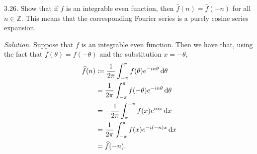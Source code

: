 \documentclass{article}
\newcommand{\Z}{\mathbb{Z}}
\begin{document}
\newpage

3.26. Show that if $f$ is an integrable even function, then $\hat{f}(n)
  = \hat{f}(-n)$ for all $n \in \Z$. This means that the corresponding
  Fourier series is a purely cosine series expansion.

\textit{Solution.}
Suppose that $f$ is an integrable even function. Then we have that,
using the fact that $f(\theta) = f(-\theta)$ and the substitution
$x = - \theta$,
%
\begin{align*}
    \widehat{f}(n)
        &\coloneqq \frac{1}{2 \pi} \int_{-\pi}^\pi f(\theta) e^{-i n \theta} \dif \theta \\
        &= \frac{1}{2 \pi} \int_{-\pi}^\pi f(-\theta) e^{-i n \theta} \dif \theta \\
        &= - \frac{1}{2 \pi} \int_{\pi}^{-\pi} f(x) e^{i n x} \dif x \\
        &= \frac{1}{2 \pi} \int_{-\pi}^{\pi} f(x) e^{-i (-n) x} \dif x \\
        &= \widehat{f}(-n)
        .
\end{align*}
\end{document}
